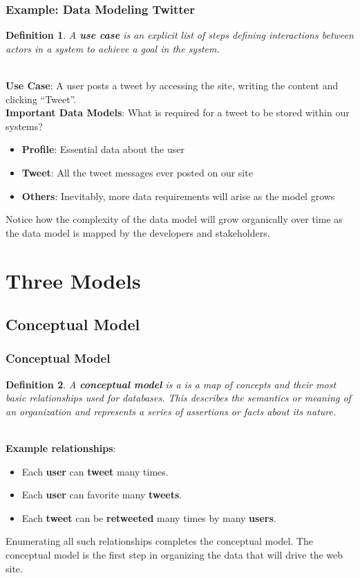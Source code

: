 \documentclass[aspectratio=169]{beamer}
\newtheorem{defn}{Definition}
\begin{document}
\begin{frame}
\frametitle{Example: Data Modeling Twitter}
\begin{defn}
A \textbf{use case} is an explicit list of steps defining interactions between actors in a system to achieve a \textit{goal} in the system.
\end{defn}
\pause
\mbox{}\\
\textbf{Use Case}: A user posts a tweet by accessing the site, writing the content and clicking ``Tweet''.
\pause
\mbox{}\\
\textbf{Important Data Models}: What is required for a tweet to be stored within our systems?
\begin{itemize}
	\item \textbf{Profile}: Essential data about the user
	\item \textbf{Tweet}: All the tweet messages ever posted on our site
	\item \textbf{Others}: Inevitably, more data requirements will arise as the model grows
\end{itemize}
Notice how the complexity of the data model will grow organically over time as the data model is mapped by the developers and stakeholders.
\end{frame}

\section{Three Models}
\subsection{Conceptual Model}
\begin{frame}
\frametitle{Conceptual Model}
\begin{defn}
A \textbf{conceptual model} is a is a map of concepts and their most basic relationships used for databases. This describes the semantics or meaning of an organization and represents a series of assertions or facts about its nature.
\end{defn}
\pause
\mbox{}\\
\textbf{Example relationships}:
\begin{itemize}
	\item Each \textbf{user} can \textbf{tweet} many times.
	\item Each \textbf{user} can favorite many \textbf{tweets}.
	\item Each \textbf{tweet} can be \textbf{retweeted} many times by many \textbf{users}.
\end{itemize}
Enumerating all such relationships completes the conceptual model. The conceptual model is the first step in organizing the data that will drive the web site.
\end{frame}
\end{document}
